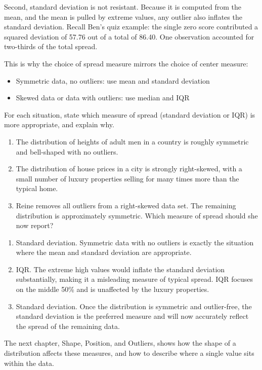 Second, standard deviation is not resistant. Because it is computed
from the mean, and the mean is pulled by extreme values, any outlier
also inflates the standard deviation. Recall Ben's quiz example: the
single zero score contributed a squared deviation of 57.76 out of a
total of 86.40. One observation accounted for two-thirds of the total
spread.

This is why the choice of spread measure mirrors the choice of center
measure:

\begin{itemize}
    \item Symmetric data, no outliers: use mean and standard deviation
    \item Skewed data or data with outliers: use median and IQR
\end{itemize}

\begin{Exercise}[title={Choosing a Measure of Spread},
label={ex:choose_spread}]
For each situation, state which measure of spread (standard deviation
or IQR) is more appropriate, and explain why.

\begin{enumerate} 
    \item The distribution of heights of adult men in a country is
    roughly symmetric and bell-shaped with no outliers.
    \item The distribution of house prices in a city is strongly
    right-skewed, with a small number of luxury properties selling
    for many times more than the typical home.
    \item Reine removes all outliers from a right-skewed data
    set. The remaining distribution is approximately symmetric. Which
    measure of spread should she now report?
\end{enumerate}
\end{Exercise}

\begin{Answer}[ref={ex:choose_spread}]
\begin{enumerate} 
    \item Standard deviation. Symmetric data with no outliers is
    exactly the situation where the mean and standard deviation
    are appropriate.
    \item IQR. The extreme high values would inflate the standard
    deviation substantially, making it a misleading measure of
    typical spread. IQR focuses on the middle 50\% and is
    unaffected by the luxury properties.
    \item Standard deviation. Once the distribution is symmetric and
    outlier-free, the standard deviation is the preferred measure and
    will now accurately reflect the spread of the remaining data.
\end{enumerate}
\end{Answer}

The next chapter, Shape, Position, and Outliers, shows how the shape of a distribution affects these
measures, and how to describe where a single value sits within the data.
